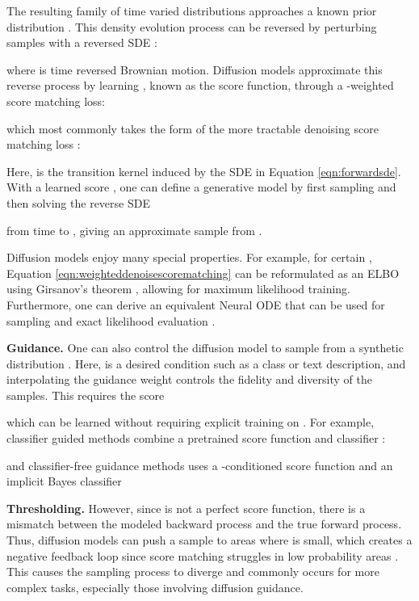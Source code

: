 \documentclass{article}
\theoremstyle{plain}
\theoremstyle{definition}
\theoremstyle{remark}
\begin{document}
The resulting family of time varied distributions  approaches a known prior distribution . This density evolution process can be reversed by perturbing samples  with a reversed SDE \citep{Anderson1982ReversetimeDE}:

where  is time reversed Brownian motion. Diffusion models approximate this reverse process by learning , known as the score function, through a -weighted score matching loss:

which most commonly takes the form of the more tractable denoising score matching loss \citep{Vincent2011ACB}:

Here,  is the transition kernel induced by the SDE in Equation \ref{eqn:forwardsde}. With a learned score , one can define a generative model by first sampling  and then solving the reverse SDE

from time  to , giving an approximate sample from .

Diffusion models enjoy many special properties. For example, for certain , Equation \ref{eqn:weighteddenoisescorematching} can be reformulated as an ELBO using Girsanov's theorem \citep{Song2021MaximumLT,Kingma2021VariationalDM, Huang2021AVP}, allowing for maximum likelihood training. Furthermore, one can derive an equivalent Neural ODE that can be used for sampling and exact likelihood evaluation \citep{Chen2018NeuralOD}.

\textbf{Guidance.} One can also control the diffusion model to sample from a synthetic distribution . Here,  is a desired condition such as a class or text description, and interpolating the guidance weight  controls the fidelity and diversity of the samples. This requires the score

which can be learned  without requiring explicit training on . For example, classifier guided methods \citep{Song2020ScoreBasedGM, Dhariwal2021DiffusionMB} combine a pretrained score function  and classifier :

and classifier-free guidance methods \citep{Ho2022ClassifierFreeDG} uses a -conditioned score function and an implicit Bayes classifier 

\textbf{Thresholding.} However, since  is not a perfect score function, there is a mismatch between the modeled backward process and the true forward process. Thus, diffusion models can push a sample to areas where  is small, which creates a negative feedback loop since score matching struggles in low probability areas \citep{Song2019GenerativeMB, Koehler2022StatisticalEO}. This causes the sampling process to diverge and commonly occurs for more complex tasks, especially those involving diffusion guidance.
\end{document}
